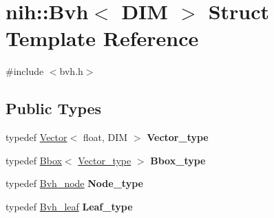 \hypertarget{structnih_1_1_bvh}{
\section{nih\-:\-:\-Bvh$<$ \-D\-I\-M $>$ \-Struct \-Template \-Reference}
\label{structnih_1_1_bvh}
}


{\ttfamily \#include $<$bvh.\-h$>$}

\subsection*{\-Public \-Types}
\begin{DoxyCompactItemize}
\item 
\hypertarget{structnih_1_1_bvh_ade838d80df9000688b95c6f16dbf5b4b}{
typedef \hyperlink{structnih_1_1_vector}{\-Vector}$<$ float, \-D\-I\-M $>$ {\bfseries \-Vector\-\_\-type}}
\label{structnih_1_1_bvh_ade838d80df9000688b95c6f16dbf5b4b}

\item 
\hypertarget{structnih_1_1_bvh_af1c87d53fa29e731633c5a66bb5ff40a}{
typedef \hyperlink{structnih_1_1_bbox}{\-Bbox}$<$ \hyperlink{structnih_1_1_vector}{\-Vector\-\_\-type} $>$ {\bfseries \-Bbox\-\_\-type}}
\label{structnih_1_1_bvh_af1c87d53fa29e731633c5a66bb5ff40a}

\item 
\hypertarget{structnih_1_1_bvh_a2020a95ccfdd29f0bae5156733045aff}{
typedef \hyperlink{structnih_1_1_bvh__node}{\-Bvh\-\_\-node} {\bfseries \-Node\-\_\-type}}
\label{structnih_1_1_bvh_a2020a95ccfdd29f0bae5156733045aff}

\item 
\hypertarget{structnih_1_1_bvh_aa8a5c36664a5dc841b27affe8b000b3a}{
typedef \hyperlink{structnih_1_1_bvh__leaf}{\-Bvh\-\_\-leaf} {\bfseries \-Leaf\-\_\-type}}
\label{structnih_1_1_bvh_aa8a5c36664a5dc841b27affe8b000b3a}

\end{DoxyCompactItemize}

